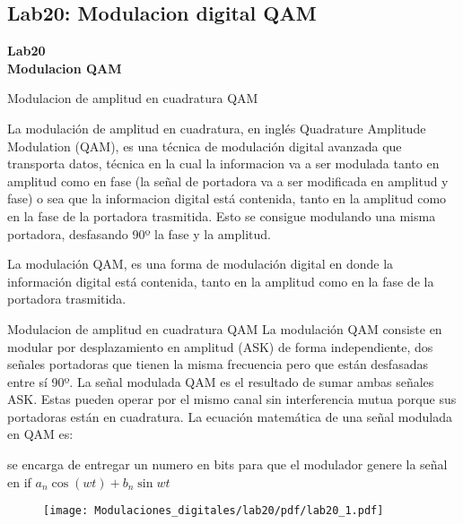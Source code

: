\subsection{Lab20: Modulacion digital QAM}

\begin{frame}{}


\bfseries{\textrm{\LARGE Lab20\\ \Large Modulacion QAM}}
\raggedright
\end{frame}

\begin{frame}{Modulacion de amplitud en cuadratura QAM}
\begin{flushleft}
La modulación de amplitud en cuadratura, en inglés Quadrature Amplitude Modulation (QAM), es una técnica de modulación digital avanzada que transporta datos, técnica en la cual la informacion va a ser modulada tanto en amplitud como en fase (la señal de portadora va a ser modificada en amplitud y fase) o sea que la informacion digital está contenida, tanto en la amplitud como en la fase de la portadora trasmitida. Esto se consigue modulando una misma portadora, desfasando 90º la fase y la amplitud.
\end{flushleft}

La modulación QAM, es una forma de modulación digital en donde la información digital está contenida, tanto en la amplitud como en la fase de la portadora trasmitida.
\end{frame}

\begin{frame}{Modulacion de amplitud en cuadratura QAM}
La modulación QAM consiste en modular por desplazamiento en amplitud (ASK) de forma independiente, dos señales portadoras que tienen la misma frecuencia pero que están desfasadas entre sí 90º. La señal modulada QAM es el resultado de sumar ambas señales ASK. Estas pueden operar por el mismo canal sin interferencia mutua porque sus portadoras están en cuadratura. La ecuación matemática de una señal modulada en QAM es:


se encarga de entregar un numero en bits para que el modulador genere la señal en if
${ a }_{ n }\cos { (wt) } +b_{ n }\sin { wt } $
 

\begin{figure}[H]
\centering
\texttt{[image: Modulaciones\_digitales/lab20/pdf/lab20\_1.pdf]}
\end{figure}
\end{frame}

